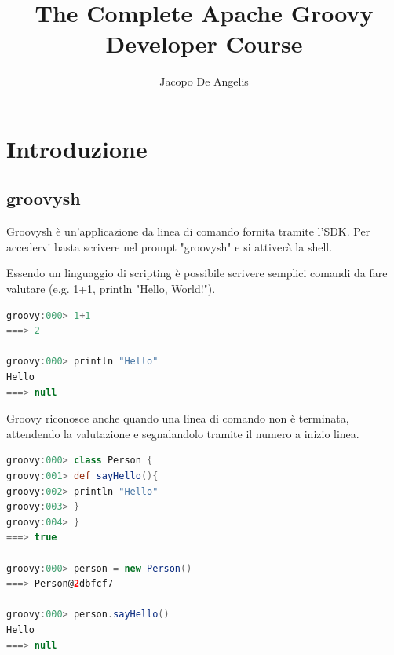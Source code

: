 \documentclass[11pt,a4paper]{book}
\begin{document}
\title{The Complete Apache Groovy Developer Course}
\author{Jacopo De Angelis}
\maketitle

\pagebreak
\tableofcontents
\pagebreak

\chapter{Introduzione}
\section{groovysh}
Groovysh è un'applicazione da linea di comando fornita tramite l'SDK. Per accedervi basta scrivere nel prompt "groovysh" e si attiverà la shell.

Essendo un linguaggio di scripting è possibile scrivere semplici comandi da fare valutare (e.g. 1+1, println "Hello, World!").

\begin{lstlisting}[language = groovy]
groovy:000> 1+1
===> 2

groovy:000> println "Hello"
Hello
===> null
\end{lstlisting}

Groovy riconosce anche quando una linea di comando non è terminata, attendendo la valutazione e segnalandolo tramite il numero a inizio linea.
\begin{lstlisting}[language = groovy]
groovy:000> class Person {
groovy:001> def sayHello(){
groovy:002> println "Hello"
groovy:003> }
groovy:004> }
===> true

groovy:000> person = new Person()
===> Person@2dbfcf7

groovy:000> person.sayHello()
Hello
===> null
\end{lstlisting}
\end{document}

